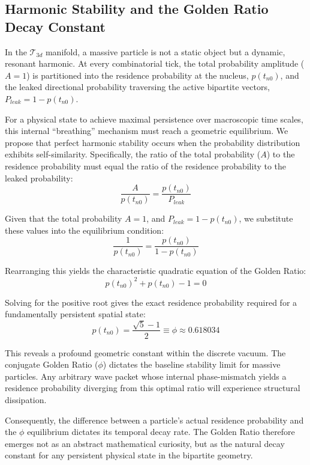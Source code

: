 \subsection{Harmonic Stability and the Golden Ratio Decay Constant}
\label{subsec:golden_ratio}

In the $\mathcal{T}_{3d}$ manifold, a massive particle is not a static object but 
a dynamic, resonant harmonic. At every combinatorial tick, the total probability 
amplitude ($A=1$) is partitioned into the residence probability at the nucleus, 
$p(t_{n0})$, and the leaked directional probability traversing the active bipartite 
vectors, $P_{leak} = 1 - p(t_{n0})$. 

For a physical state to achieve maximal persistence over macroscopic time scales, 
this internal ``breathing'' mechanism must reach a geometric equilibrium. We propose 
that perfect harmonic stability occurs when the probability distribution exhibits 
self-similarity. Specifically, the ratio of the total probability ($A$) to the 
residence probability must equal the ratio of the residence probability to the leaked 
probability:
\begin{equation}
    \frac{A}{p(t_{n0})} = \frac{p(t_{n0})}{P_{leak}}
\end{equation}

Given that the total probability $A = 1$, and $P_{leak} = 1 - p(t_{n0})$, we substitute these 
values into the equilibrium condition:
\begin{equation}
    \frac{1}{p(t_{n0})} = \frac{p(t_{n0})}{1 - p(t_{n0})}
\end{equation}

Rearranging this yields the characteristic quadratic equation of the Golden Ratio:
\begin{equation}
    p(t_{n0})^2 + p(t_{n0}) - 1 = 0
\end{equation}

Solving for the positive root gives the exact residence probability required for a fundamentally persistent spatial state:
\begin{equation}
    p(t_{n0}) = \frac{\sqrt{5} - 1}{2} \equiv \phi \approx 0.618034
\end{equation}

This reveals a profound geometric constant within the discrete vacuum. The conjugate Golden Ratio ($\phi$) dictates the baseline 
stability limit for massive particles. Any arbitrary wave packet whose internal phase-mismatch yields a residence probability 
diverging from this optimal ratio will experience structural dissipation. 

Consequently, the difference between a particle's actual residence probability and the $\phi$ equilibrium dictates its temporal 
decay rate. The Golden Ratio therefore emerges not as an abstract mathematical curiosity, but as the natural decay constant for 
any persistent physical state in the bipartite geometry.